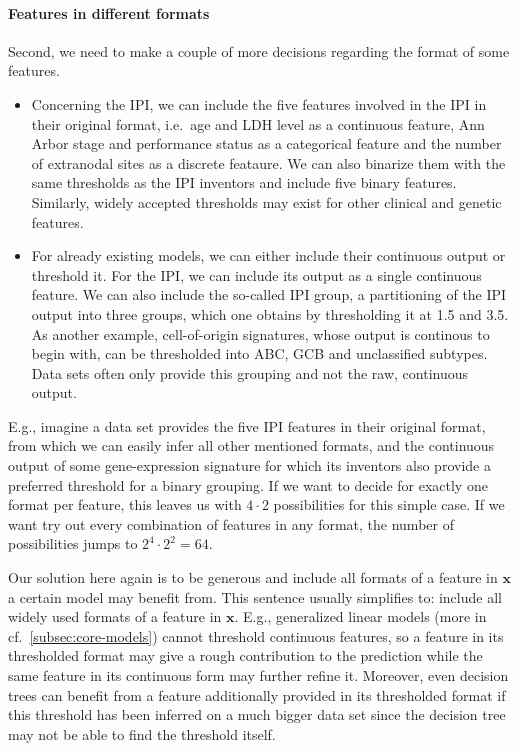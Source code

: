 \paragraph{Features in different formats}
Second, we need to make a couple of more decisions regarding the format of some features.
\begin{itemize}
    \item Concerning the IPI, we can include the five features involved in the IPI in their original
        format, i.e.\ age and LDH level as a continuous feature, Ann Arbor stage and performance 
        status as a categorical feature and the number of extranodal sites as a discrete feataure.
        We can also binarize them with the same thresholds as the IPI inventors and include five 
        binary features.  Similarly, widely accepted thresholds may exist for other clinical and genetic 
        features.
    \item For already existing models, we can either include their continuous output or threshold 
        it. For the IPI, we can include its output as a single continuous feature. We can also 
        include the so-called IPI group, a partitioning of the IPI output into three groups, which 
        one obtains by thresholding it at \num{1.5} and \num{3.5}. As another example, 
        cell-of-origin signatures, whose output is continous to begin with, can be thresholded into 
        ABC, GCB and unclassified subtypes. Data sets often only provide this grouping and not the 
        raw, continuous output. 
\end{itemize}

E.g., imagine a data set provides the five IPI features in their original format, from which we can 
easily infer all other mentioned formats, and the continuous output of some gene-expression 
signature for which its inventors also provide a preferred threshold for a binary grouping. 
If we want to decide for 
exactly one format per feature, this leaves us with $4 \cdot 2$ possibilities for this simple case. 
If we want try out every combination of features in any format, the number of possibilities jumps to 
$2^4 \cdot 2^2 = 64$. 

Our solution here again is to be generous and include all formats of a feature in $\mathbf{x}$ a 
certain model may benefit from. This sentence usually 
simplifies to: include all widely used formats of a feature in $\mathbf{x}$. E.g., generalized 
linear models (more in cf.\ \ref{subsec:core-models}) cannot threshold continuous features, so a 
feature in its thresholded format may give 
a rough contribution to the prediction while the same feature in its continuous form may further 
refine it. Moreover, even decision trees can benefit from a feature additionally provided in its 
thresholded format if this threshold has been inferred on a much bigger data set since the decision 
tree may not be able to find the threshold itself.

